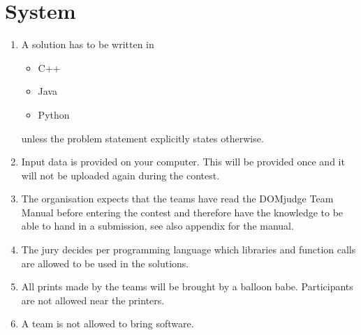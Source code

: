 \documentclass[11pt]{report}
\begin{document}
\section{System}
\begin{enumerate}[label=\bfseries 4.4.\arabic*]
\item A solution has to be written in 
\begin{itemize}
	\item C++
	\item Java
	\item Python
\end{itemize}
unless the problem statement explicitly states otherwise.
\item \label{input} Input data is provided on your computer. This will be provided once and it will not be uploaded again during the contest.
\item The organisation expects that the teams have read the DOMjudge Team Manual before entering the contest and therefore have the knowledge to be able to hand in a submission, see also appendix for the manual.
\item The jury decides per programming language which libraries and function calls are allowed to be used in the solutions.
\item All prints made by the teams will be brought by a balloon babe. Participants are not allowed near the printers.
\item \label{software}A team is not allowed to bring software.
\end{enumerate}
\end{document}
